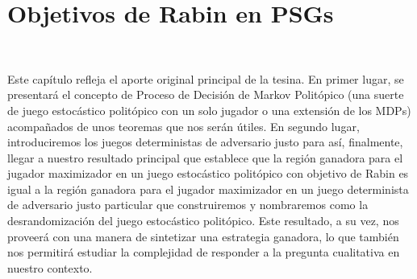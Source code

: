 \chapter{Objetivos de Rabin en PSGs}
~\label{cap:results}
\vspace{-1cm}

Este capítulo refleja el aporte original principal de la tesina. En primer
lugar, se presentará el concepto de Proceso de Decisión de Markov Politópico
(una suerte de juego estocástico politópico con un solo jugador o una extensión
de los MDPs) acompañados de unos teoremas que nos serán útiles. En segundo
lugar, introduciremos los juegos deterministas de adversario justo para así,
finalmente, llegar a nuestro resultado principal que establece que la región
ganadora para el jugador maximizador en un juego estocástico politópico con
objetivo de Rabin es igual a la región ganadora para el jugador maximizador en
un juego determinista de adversario justo particular que construiremos y
nombraremos como la desrandomización del juego estocástico politópico. Este
resultado, a su vez, nos proveerá con una manera de sintetizar una estrategia
ganadora, lo que también nos permitirá estudiar la complejidad de responder a
la pregunta cualitativa en nuestro contexto.




